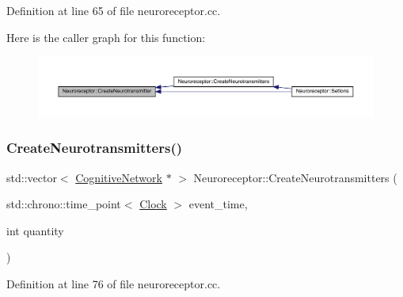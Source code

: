 Definition at line 65 of file neuroreceptor.\+cc.

Here is the caller graph for this function\+:\nopagebreak
\begin{figure}[H]
\begin{center}
\leavevmode
\includegraphics[width=350pt]{class_neuroreceptor_af671059884336eadbc367f9d8556eb3f_icgraph}
\end{center}
\end{figure}
\mbox{\label{class_neuroreceptor_aa0037379ecb214ff982429e054f2a194}} 
\subsubsection{\texorpdfstring{Create\+Neurotransmitters()}{CreateNeurotransmitters()}}
{\footnotesize\ttfamily std\+::vector$<$ \hyperlink{class_cognitive_network}{Cognitive\+Network} $\ast$ $>$ Neuroreceptor\+::\+Create\+Neurotransmitters (\begin{DoxyParamCaption}\item[{std\+::chrono\+::time\+\_\+point$<$ \hyperlink{universe_8h_a0ef8d951d1ca5ab3cfaf7ab4c7a6fd80}{Clock} $>$}]{event\+\_\+time,  }\item[{int}]{quantity }\end{DoxyParamCaption})}



Definition at line 76 of file neuroreceptor.\+cc.

